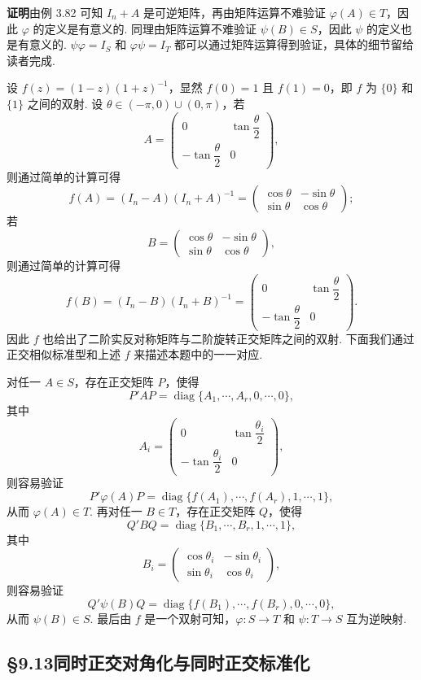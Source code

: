 \documentclass[UTF8, 12pt, fontset=fandol, oneside]{ctexart}
\begin{document}
\noindent\textbf{证明}\quad 由例 3.82 可知 $I_n+A$ 是可逆矩阵，再由矩阵运算不难验证 $\varphi(A)\in T$，因此 $\varphi$ 的定义是有意义的. 同理由矩阵运算不难验证 $\psi(B)\in S$，因此 $\psi$ 的定义也是有意义的. $\psi\varphi=I_S$ 和 $\varphi\psi=I_T$ 都可以通过矩阵运算得到验证，具体的细节留给读者完成.

设 $f(z)=(1-z)(1+z)^{-1}$，显然 $f(0)=1$ 且 $f(1)=0$，即 $f$ 为 $\{0\}$ 和 $\{1\}$ 之间的双射. 设 $\theta\in(-\pi,0)\cup(0,\pi)$，若
\[
A=\begin{pmatrix}
0&\tan\dfrac{\theta}{2}\\
-\tan\dfrac{\theta}{2}&0
\end{pmatrix},
\]
则通过简单的计算可得
\[
f(A)=(I_n-A)(I_n+A)^{-1}
=\begin{pmatrix}
\cos\theta&-\sin\theta\\
\sin\theta&\cos\theta
\end{pmatrix};
\]
若
\[
B=\begin{pmatrix}
\cos\theta&-\sin\theta\\
\sin\theta&\cos\theta
\end{pmatrix},
\]
则通过简单的计算可得
\[
f(B)=(I_n-B)(I_n+B)^{-1}
=\begin{pmatrix}
0&\tan\dfrac{\theta}{2}\\
-\tan\dfrac{\theta}{2}&0
\end{pmatrix}.
\]
因此 $f$ 也给出了二阶实反对称矩阵与二阶旋转正交矩阵之间的双射. 下面我们通过正交相似标准型和上述 $f$ 来描述本题中的一一对应.

对任一 $A\in S$，存在正交矩阵 $P$，使得
\[
P'AP=\operatorname{diag}\{A_1,\cdots,A_r,0,\cdots,0\},
\]
其中
\[
A_i=\begin{pmatrix}
0&\tan\dfrac{\theta_i}{2}\\
-\tan\dfrac{\theta_i}{2}&0
\end{pmatrix},
\]
则容易验证
\[
P'\varphi(A)P=\operatorname{diag}\{f(A_1),\cdots,f(A_r),1,\cdots,1\},
\]
从而 $\varphi(A)\in T$. 再对任一 $B\in T$，存在正交矩阵 $Q$，使得
\[
Q'BQ=\operatorname{diag}\{B_1,\cdots,B_r,1,\cdots,1\},
\]
其中
\[
B_i=\begin{pmatrix}
\cos\theta_i&-\sin\theta_i\\
\sin\theta_i&\cos\theta_i
\end{pmatrix},
\]
则容易验证
\[
Q'\psi(B)Q=\operatorname{diag}\{f(B_1),\cdots,f(B_r),0,\cdots,0\},
\]
从而 $\psi(B)\in S$. 最后由 $f$ 是一个双射可知，$\varphi:S\to T$ 和 $\psi:T\to S$ 互为逆映射.

\subsection*{§9.13\quad 同时正交对角化与同时正交标准化}
\end{document}
